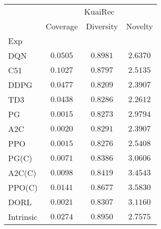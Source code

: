\begin{tabular}{lccc}
 & \multicolumn{3}{c}{KuaiRec} \\
 & Coverage & Diversity & Novelty \\
Exp &  &  &  \\
DQN & \underline{$0.0505$} & $\mathbf{0.8981}$ & $2.6370$ \\
C51 & $\mathbf{0.1027}$ & $0.8797$ & $2.5135$ \\
DDPG & $0.0477$ & $0.8209$ & $2.3907$ \\
TD3 & $0.0438$ & $0.8286$ & $2.2612$ \\
PG & $0.0015$ & $0.8273$ & $2.9794$ \\
A2C & $0.0020$ & $0.8291$ & $2.3907$ \\
PPO & $0.0015$ & $0.8276$ & $2.5408$ \\
PG(C) & $0.0071$ & $0.8386$ & $3.0606$ \\
A2C(C) & $0.0098$ & $0.8419$ & \underline{$3.4543$} \\
PPO(C) & $0.0141$ & $0.8677$ & $\mathbf{3.5830}$ \\
DORL & $0.0021$ & $0.8307$ & $3.1160$ \\
Intrinsic & $0.0274$ & \underline{$0.8950$} & $2.7575$ \\
\end{tabular}
